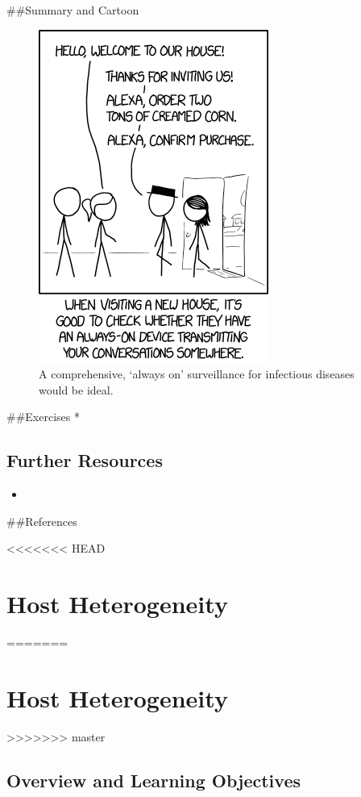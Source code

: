 \documentclass[]{book}
\theoremstyle{definition}
\theoremstyle{definition}
\theoremstyle{definition}
\theoremstyle{remark}
\begin{document}
\#\#Summary and Cartoon

\begin{figure}
\centering
\includegraphics{./images/xkcd-listening.png}
\caption{A comprehensive, `always on' surveillance for infectious
diseases would be ideal.}
\end{figure}

\#\#Exercises *

\hypertarget{further-resources-3}{%
\section{Further Resources}\label{further-resources-3}}

\begin{itemize}
\item
\end{itemize}

\#\#References

<<<<<<< HEAD
\hypertarget{heterogeneity}{%
\chapter{Host Heterogeneity}\label{heterogeneity}}
=======
\chapter{Host Heterogeneity}\label{heterogeneity}
>>>>>>> master

\hypertarget{overview-and-learning-objectives-10}{%
\section{Overview and Learning
Objectives}\label{overview-and-learning-objectives-10}}
\end{document}
